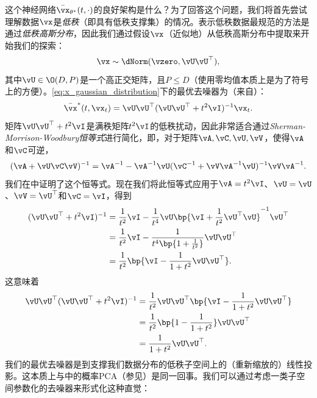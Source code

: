 \documentclass[../../book-main_zh.tex]{subfiles}
\begin{document}
这个神经网络\(\bar{\vx}_{\theta^{\ast}}(t, \cdot)\)的良好架构是什么？为了回答这个问题，我们将首先尝试理解数据\(\vx\)是\textit{低秩}（即具有低秩支撑集）的情况。表示低秩数据最规范的方法是通过\textit{低秩高斯分布}，因此我们通过假设\(\vx\)（近似地）从低秩高斯分布中提取来开始我们的探索：
\begin{equation}\label{eq:x_gaussian_distribution}
    \vx \sim \dNorm(\vzero, \vU\vU^{\top}),
\end{equation}
其中\(\vU \in \O(D, P)\)是一个高正交矩阵，且\(P \leq D\)（使用零均值本质上是为了符号上的方便）。\eqref{eq:x_gaussian_distribution}下的最优去噪器为（来自）：
\begin{equation}\label{eq:optimal denoiser}
    \bar{\vx}^{\ast}(t, \vx_{t}) = \vU\vU^{\top}(\vU\vU^{\top} +
    t^{2}\vI)^{-1}\vx_{t}.
\end{equation}
矩阵\(\vU\vU^{\top} + t^{2}\vI\)是满秩矩阵\(t^{2}\vI\)的低秩扰动，因此非常适合通过\textit{Sherman-Morrison-Woodbury恒等式}进行简化，即，对于矩阵\(\vA, \vC, \vU, \vV\)，使得\(\vA\)和\(\vC\)可逆，
\begin{equation}\label{eq:sherman_morrison_woodbury}
    (\vA + \vU\vC\vV)^{-1} = \vA^{-1} - \vA^{-1}\vU(\vC^{-1} +
    \vV\vA^{-1}\vU)^{-1}\vV\vA^{-1}.
\end{equation}
我们在中证明了这个恒等式。现在我们将此恒等式应用于\(\vA = t^{2}\vI\)、\(\vU = \vU\)、\(\vV = \vU^{\top}\)和\(\vC = \vI\)，得到
\begin{align}
    (\vU\vU^{\top} + t^{2}\vI)^{-1}
    &= \frac{1}{t^{2}}\vI - \frac{1}{t^{4}}\vU\bp{\vI +
    \frac{1}{t^{2}}\vU^{\top}\vU}^{-1}\vU^{\top} \\
    &= \frac{1}{t^{2}}\vI - \frac{1}{t^{4}\bp{1 +
    \frac{1}{t^{2}}}}\vU\vU^{\top} \\
    &= \frac{1}{t^{2}}\bp{\vI - \frac{1}{1 +
    t^{2}}\vU\vU^{\top}}.\label{eq:gaussian_lowrank_inverse_perturbation_simplified}
\end{align}
这意味着
\begin{align}
    \vU\vU^{\top}(\vU\vU^{\top} + t^{2}\vI)^{-1}
    &= \frac{1}{t^{2}}\vU\vU^{\top}\bp{\vI - \frac{1}{1 +
    t^{2}}\vU\vU^{\top}} \\
    &= \frac{1}{t^{2}}\bp{1 - \frac{1}{1 + t^{2}}}\vU\vU^{\top} \\
    &= \frac{1}{1 +
    t^{2}}\vU\vU^{\top}.\label{eq:gaussian_lowrank_denoiser_simplified}
\end{align}
我们的最优去噪器是到支撑我们数据分布的低秩子空间上的（重新缩放的）线性投影。这本质上与中的概率PCA（参见）是同一回事。我们可以通过考虑一类子空间参数化的去噪器来形式化这种直觉：
\end{document}
